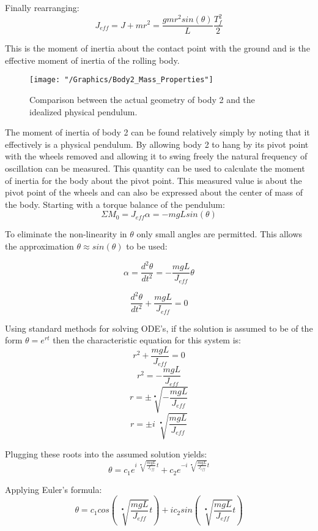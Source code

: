 \documentclass{article}
\begin{document}
	Finally rearranging:
	$$J_{eff} = J + mr^2 = \frac{gmr^2sin(\theta)}{L} \frac{T_f^2}{2}$$
	
	This is the moment of inertia about the contact point with the ground and is the effective moment of inertia of the rolling body.
	
	\begin{figure}[h]
		\centerline{\texttt{[image: "/Graphics/Body2\_Mass\_Properties"]}}
		\caption{Comparison between the actual geometry of body 2 and the idealized physical pendulum.}
		\label{fig:Body2MassProps}
	\end{figure}
	The moment of inertia of body 2 can be found relatively simply by noting that it effectively is a physical pendulum. By allowing body 2 to hang by its pivot point with the wheels removed and allowing it to swing freely the natural frequency of oscillation can be measured. This quantity can be used to calculate the moment of inertia for the body about the pivot point. This measured value is about the pivot point of the wheels and can also be expressed about the center of mass of the body. Starting with a torque balance of the pendulum:
	\begin{equation}
		\label{eqn:PhysicalPendTorqueBalance}
		\Sigma M_0 = J_{eff} \alpha = -mgLsin(\theta)
	\end{equation}
	
	To eliminate the non-linearity in $\theta$ only small angles are permitted. This allows the approximation $\theta \approx sin(\theta)$ to be used:
	
	$$\alpha = \frac{d^2 \theta}{dt^2} = -\frac{mgL}{J_{eff}}\theta$$
	
	\begin{equation}
		\label{eqn:PhysicalPendLinearODE}
		\frac{d^2 \theta}{dt^2} + \frac{mgL}{J_{eff}} = 0
	\end{equation}
	
	Using standard methods for solving ODE's, if the solution is assumed to be of the form $\theta = e^{rt}$ then the characteristic equation for this system is:
	$$r^2 + \frac{mgL}{J_{eff}} = 0$$
	$$r^2 = -\frac{mgL}{J_{eff}}$$
	$$r = \pm \sqrt[•]{-\frac{mgL}{J_{eff}}}$$
	$$r = \pm i \; \sqrt[•]{\frac{mgL}{J_{eff}}}$$  %
	
	Plugging these roots into the assumed solution yields:
	$$\theta = c_1 e^{i \; \sqrt[•]{\frac{mgL}{J_{eff}}}t} + c_2 e^{-i \; \sqrt[•]{\frac{mgL}{J_{eff}}}t}$$
	
	Applying Euler's formula:
	$$\theta = c_1 cos(\; \sqrt[•]{\frac{mgL}{J_{eff}}}t) + i c_2 sin(\; \sqrt[•]{\frac{mgL}{J_{eff}}}t)$$
	
\end{document}
